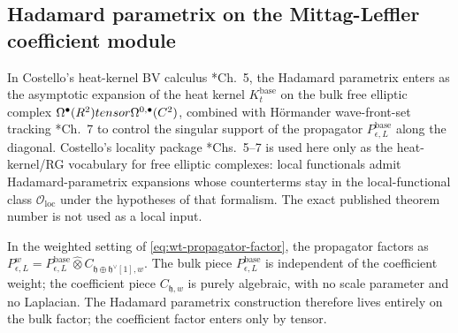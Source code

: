 %
%

\subsection*{Hadamard parametrix on the Mittag-Leffler coefficient module}

\begin{rmk}\label{rmk:hadamard-factorization}
  In Costello's heat-kernel BV calculus
  \cite{costello-renormalization}*{Ch.~5}, the Hadamard parametrix
  enters as the asymptotic expansion of the heat kernel
  $K_t^{\mathrm{base}}$ on the bulk free elliptic complex
  $\Omega^\bullet(R^2)tensor\Omega^{0,\bullet}(C^2)$,
  combined with Hörmander wave-front-set tracking
  \cite{hormander-vol1}*{Ch.~7} to control the singular support of the
  propagator $P_{\epsilon,L}^{\mathrm{base}}$ along the diagonal.
  Costello's locality package
  \cite{costello-renormalization}*{Chs.~5--7} is used here only as the
  heat-kernel/RG vocabulary for free elliptic complexes: local
  functionals admit Hadamard-parametrix expansions whose counterterms
  stay in the local-functional class $\mathcal O_{\mathrm{loc}}$ under
  the hypotheses of that formalism.  The exact published theorem number
  is not used as a local input.

  In the weighted setting of \ref{eq:wt-propagator-factor}, the
  propagator factors as
  $P_{\epsilon,L}^{w}=P_{\epsilon,L}^{\mathrm{base}}\widehat\otimes
   C_{\mathfrak h\oplus\mathfrak h^\vee[1],w}$. The bulk piece
  $P_{\epsilon,L}^{\mathrm{base}}$ is independent of the coefficient
  weight; the coefficient piece $C_{\mathfrak h,w}$ is purely
  algebraic, with no scale parameter and no Laplacian. The Hadamard
  parametrix construction therefore lives entirely on the bulk
  factor; the coefficient factor enters only by tensor.
\end{rmk}

